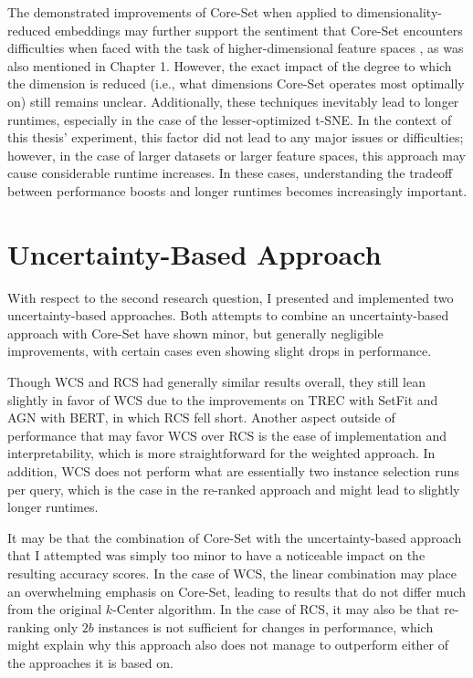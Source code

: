 \documentclass[english,bachelor,ul]{webisthesis} %
\begin{document}
The demonstrated improvements of Core-Set when applied to dimensionality-reduced embeddings may further support the sentiment that Core-Set encounters difficulties when faced with the task of higher-dimensional feature spaces \citep{DBLP:conf/iccv/SinhaED19}, as was also mentioned in Chapter 1. However, the exact impact of the degree to which the dimension is reduced (i.e., what dimensions Core-Set operates most optimally on) still remains unclear. Additionally, these techniques inevitably lead to longer runtimes, especially in the case of the lesser-optimized t-SNE. In the context of this thesis' experiment, this factor did not lead to any major issues or difficulties; however, in the case of larger datasets or larger feature spaces, this approach may cause considerable runtime increases. In these cases, understanding the tradeoff between performance boosts and longer runtimes becomes increasingly important. 

\section{Uncertainty-Based Approach}

With respect to the second research question, I presented and implemented two uncertainty-based approaches.  
Both attempts to combine an uncertainty-based approach with Core-Set have shown minor, but generally negligible improvements, with certain cases even showing slight drops in performance. 

Though WCS and RCS had generally similar results overall, they still lean slightly in favor of WCS due to the improvements on TREC with SetFit and AGN with BERT, in which RCS fell short. Another aspect outside of performance that may favor WCS over RCS is the ease of implementation and interpretability, which is more straightforward for the weighted approach. In addition, WCS does not perform what are essentially two instance selection runs per query, which is the case in the re-ranked approach and might lead to slightly longer runtimes. 

It may be that the combination of Core-Set with the uncertainty-based approach that I attempted was simply too minor to have a noticeable impact on the resulting accuracy scores. In the case of WCS, the linear combination may place an overwhelming emphasis on Core-Set, leading to results that do not differ much from the original $k$-Center algorithm. In the case of RCS, it may also be that re-ranking only $2b$ instances is not sufficient for changes in performance, which might explain why this approach also does not manage to outperform either of the approaches it is based on.
\end{document}
